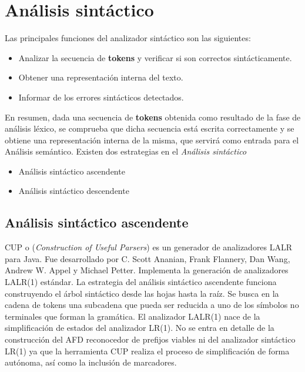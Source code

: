
\section{Análisis sintáctico}
Las principales funciones del analizador sintáctico son las siguientes:
\begin{itemize}
	\item Analizar la secuencia de \textbf{tokens} y verificar si son correctos sintácticamente.
	\item Obtener una representación interna del texto.
	\item Informar de los errores sintácticos detectados.
\end{itemize}
En resumen, dada una secuencia de \textbf{tokens} obtenida como resultado de la fase de análisis léxico, se comprueba que dicha secuencia está escrita correctamente y se obtiene una representación interna de la misma, que servirá como entrada para el Análisis semántico. 
\newline
\newline
Existen dos estrategias en el \textit{Análisis sintáctico}
\begin{itemize}
	\item Análisis sintáctico ascendente
	\item Análisis sintáctico descendente
\end{itemize}


\subsection{Análisis sintáctico ascendente}
 CUP o (\textit{Construction of Useful Parsers}) \cite{cup} es un generador de analizadores LALR para Java. Fue desarrollado por C. Scott Ananian, Frank Flannery, Dan Wang, Andrew W. Appel y Michael Petter. Implementa la generación de analizadores LALR(1) estándar. 
\newline\newline
La estrategia del análisis sintáctico ascendente funciona construyendo el árbol sintáctico desde las hojas hasta la raíz. Se busca en la cadena de tokens una subcadena que pueda ser reducida a uno de los símbolos no terminales que forman la gramática.
\newline\newline
El analizador LALR(1) nace de la simplificación de estados del analizador LR(1). No se entra en detalle de la construcción del AFD reconocedor de prefijos viables ni del analizador sintáctico LR(1) ya que la herramienta CUP realiza el proceso de simplificación de forma autónoma, así como la inclusión de marcadores.

